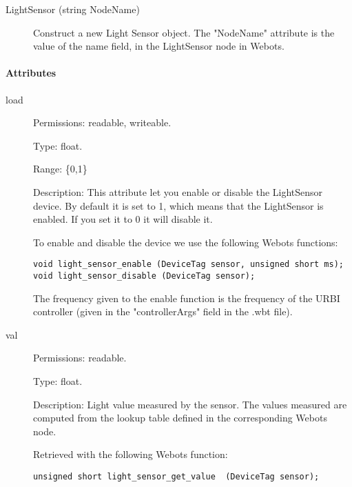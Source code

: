 \noindent
\begin{description}
\item[{LightSensor (string NodeName)}]            Construct a new Light Sensor object. The "NodeName" attribute is the value
          of the name field, in the LightSensor node in Webots.

\end{description}

\paragraph{Attributes}
\label{webots.uobjects.robotdevices.lightsensor.attributes}%

\noindent
\begin{description}
\item[{load}]     Permissions: readable, writeable.


  Type: float.


  Range: \{0,1\}


  Description: This attribute let you enable or disable the
  LightSensor device.  By default it is set to 1, which means that the
  LightSensor is enabled. If you set it to 0 it will disable it.


          To enable and disable the device we use the following Webots functions:


\begin{lstlisting}[firstnumber=1,]
void light_sensor_enable (DeviceTag sensor, unsigned short ms);
void light_sensor_disable (DeviceTag sensor);
\end{lstlisting}

          The frequency given to the enable function is the frequency of the
          URBI controller (given in the "controllerArgs" field in the .wbt file).

\item[{         val
 }]            Permissions: readable.


 Type: float.


 Description: Light value measured by the sensor. The values measured
 are computed from the lookup table defined in the corresponding
 Webots node.


          Retrieved with the following Webots function:


\begin{lstlisting}[firstnumber=1,]
unsigned short light_sensor_get_value  (DeviceTag sensor);
\end{lstlisting}
\end{description}

